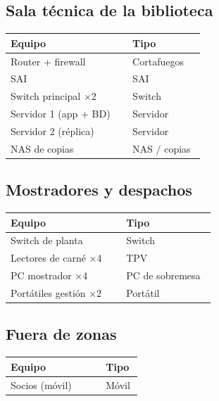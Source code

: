 \documentclass[11pt,a4paper]{article}
\begin{document}
\subsection*{Sala técnica de la biblioteca}

{\small
\begin{longtable}{@{}>{\raggedright\arraybackslash}p{0.596\linewidth}>{\raggedright\arraybackslash}p{0.353\linewidth}@{}}
\toprule
\textbf{Equipo} & \textbf{Tipo} \\
\midrule
\endhead
Router + firewall & Cortafuegos \\
SAI & SAI \\
Switch principal ×2 & Switch \\
Servidor 1 (app + BD) & Servidor \\
Servidor 2 (réplica) & Servidor \\
NAS de copias & NAS / copias \\
\bottomrule
\end{longtable}}

\subsection*{Mostradores y despachos}

{\small
\begin{longtable}{@{}>{\raggedright\arraybackslash}p{0.534\linewidth}>{\raggedright\arraybackslash}p{0.415\linewidth}@{}}
\toprule
\textbf{Equipo} & \textbf{Tipo} \\
\midrule
\endhead
Switch de planta & Switch \\
Lectores de carné ×4 & TPV \\
PC mostrador ×4 & PC de sobremesa \\
Portátiles gestión ×2 & Portátil \\
\bottomrule
\end{longtable}}

\subsection*{Fuera de zonas}

{\small
\begin{longtable}{@{}>{\raggedright\arraybackslash}p{0.686\linewidth}>{\raggedright\arraybackslash}p{0.263\linewidth}@{}}
\toprule
\textbf{Equipo} & \textbf{Tipo} \\
\midrule
\endhead
Socios (móvil) & Móvil \\
\bottomrule
\end{longtable}}
\end{document}
